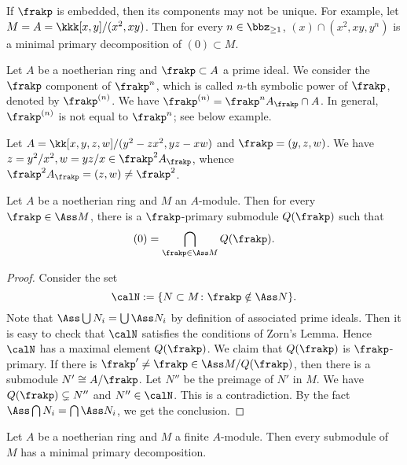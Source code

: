     \begin{example}
        If $\frakp$ is embedded, then its components may not be unique.
        For example, let $M = A = \kkk[x,y]/(x^2,xy)$.
        Then for every $n \in \bbz_{\geq 1}$, $(x) \cap (x^2,xy,y^n)$ is a minimal primary decomposition of $(0) \subset M$.
    \end{example}

    Let $A$ be a noetherian ring and $\frakp \subset A$ a prime ideal.
    We consider the $\frakp$ component of $\frakp^n$, which is called $n$-th symbolic power of $\frakp$, denoted by $\frakp^{(n)}$.
    We have $\frakp^{(n)} = \frakp^nA_\frakp \cap A$.
    In general, $\frakp^{(n)}$ is not equal to $\frakp^n$; see below example.

    \begin{example}
        Let $A = \kk[x,y,z,w]/(y^2-zx^2,yz-xw)$ and $\frakp = (y,z,w)$.
        We have $z = y^2/x^2,w = yz/x \in \frakp^2 A_\frakp$, whence $\frakp^2 A_\frakp = (z,w) \neq \frakp^2$.
    \end{example}
    
    \begin{theorem}\label{thm: primary decomposition for general module}
        Let $A$ be a noetherian ring and $M$ an $A$-module.
        Then for every $\frakp \in \Ass M$, there is a $\frakp$-primary submodule $Q(\frakp)$ such that 
        \[ (0) = \bigcap_{\frakp \in \Ass M} Q(\frakp). \] 
    \end{theorem}
    \begin{proof}
        Consider the set 
        \[ \calN:= \{N \subset M \colon \frakp \notin \Ass N \}. \]
        Note that $\Ass \bigcup N_i = \bigcup \Ass N_i$ by definition of associated prime ideals.
        Then it is easy to check that $\calN$ satisfies the conditions of Zorn's Lemma.
        Hence $\calN$ has a maximal element $Q(\frakp)$.
        We claim that $Q(\frakp)$ is $\frakp$-primary.
        If there is $\frakp' \neq \frakp \in \Ass M/Q(\frakp)$, then there is a submodule $N' \cong A/\frakp$.
        Let $N''$ be the preimage of $N'$ in $M$.
        We have $Q(\frakp) \subsetneq N''$ and $N'' \in \calN$.
        This is a contradiction.
        By the fact $\Ass \bigcap N_i = \bigcap \Ass N_i$, we get the conclusion.
    \end{proof}

    \begin{corollary}\label{cor: primary decomposition for finitely generated module}
        Let $A$ be a noetherian ring and $M$ a finite $A$-module.
        Then every submodule of $M$ has a minimal primary decomposition.
    \end{corollary}
